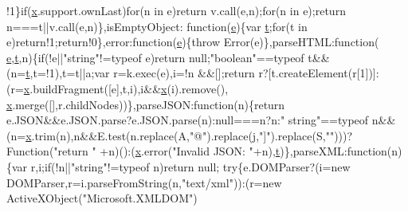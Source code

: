 \begin{DoxyCode}
      !1\}\textcolor{keywordflow}{if}(\hyperlink{jquery-1_810_82_8min_8js_a5ce50d751c9664d05375c8f5080ed43e}{x}.support.ownLast)\textcolor{keywordflow}{for}(n in e)\textcolor{keywordflow}{return} v.call(e,n);\textcolor{keywordflow}{for}(n in e);\textcolor{keywordflow}{return} n===t||v.call(e,n)\},isEmptyObject:\textcolor{keyword}{
      function}(\hyperlink{jquery-1_810_82_8min_8js_a2c038346d47955cbe2cb91e338edd7e1}{e})\{var \hyperlink{jquery-1_810_82_8min_8js_a23c5666e83bbbceee94adcd0851f50c4}{t};\textcolor{keywordflow}{for}(t in e)\textcolor{keywordflow}{return}!1;\textcolor{keywordflow}{return}!0\},error:\textcolor{keyword}{function}(\hyperlink{jquery-1_810_82_8min_8js_a2c038346d47955cbe2cb91e338edd7e1}{e})\{\textcolor{keywordflow}{throw} Error(e)\},parseHTML:\textcolor{keyword}{function}(
      \hyperlink{jquery-1_810_82_8min_8js_a2c038346d47955cbe2cb91e338edd7e1}{e},\hyperlink{jquery-1_810_82_8min_8js_a23c5666e83bbbceee94adcd0851f50c4}{t},n)\{\textcolor{keywordflow}{if}(!e||\textcolor{stringliteral}{"string"}!=typeof e)\textcolor{keywordflow}{return} null;\textcolor{stringliteral}{"boolean"}==typeof t&&(n=\hyperlink{jquery-1_810_82_8min_8js_a23c5666e83bbbceee94adcd0851f50c4}{t},t=!1),t=t||a;var r=k.exec(e),i=!n
      &&[];\textcolor{keywordflow}{return} r?[t.createElement(r[1])]:(r=\hyperlink{jquery-1_810_82_8min_8js_a5ce50d751c9664d05375c8f5080ed43e}{x}.buildFragment([e],t,i),i&&\hyperlink{jquery-1_810_82_8min_8js_a5ce50d751c9664d05375c8f5080ed43e}{x}(i).remove(),
      \hyperlink{jquery-1_810_82_8min_8js_a5ce50d751c9664d05375c8f5080ed43e}{x}.merge([],r.childNodes))\},parseJSON:\textcolor{keyword}{function}(n)\{\textcolor{keywordflow}{return} e.JSON&&e.JSON.parse?e.JSON.parse(n):null===n?n:\textcolor{stringliteral}{"
      string"}==typeof n&&(n=\hyperlink{jquery-1_810_82_8min_8js_a5ce50d751c9664d05375c8f5080ed43e}{x}.trim(n),n&&E.test(n.replace(A,\textcolor{stringliteral}{"@"}).replace(j,\textcolor{stringliteral}{"]"}).replace(S,\textcolor{stringliteral}{""})))?Function(\textcolor{stringliteral}{"return "}
      +n)():(\hyperlink{jquery-1_810_82_8min_8js_a5ce50d751c9664d05375c8f5080ed43e}{x}.error(\textcolor{stringliteral}{"Invalid JSON: "}+n),\hyperlink{jquery-1_810_82_8min_8js_a23c5666e83bbbceee94adcd0851f50c4}{t})\},parseXML:\textcolor{keyword}{function}(n)\{var r,i;\textcolor{keywordflow}{if}(!n||\textcolor{stringliteral}{"string"}!=typeof n)\textcolor{keywordflow}{return} null;\textcolor{keywordflow}{
      try}\{e.DOMParser?(i=\textcolor{keyword}{new} DOMParser,r=i.parseFromString(n,\textcolor{stringliteral}{"text/xml"})):(r=\textcolor{keyword}{new} ActiveXObject(\textcolor{stringliteral}{"Microsoft.XMLDOM"})

\end{DoxyCode}
